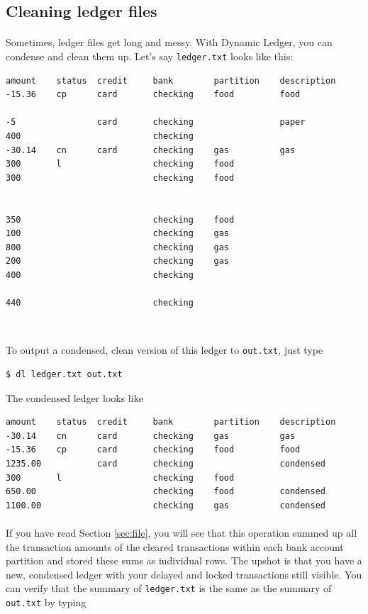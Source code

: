 \documentclass{article}
\providecommand{\q}{$\quad$ \newline}
\begin{document}
\begin{flushleft}
\clearpage

\subsection{Cleaning ledger files}

\paragraph{} Sometimes, ledger files get long and messy. With Dynamic Ledger, you can condense and clean them up. Let's say {\tt ledger.txt} looks like this: 

\begin{lstlisting}[title=ledger.txt]
amount    status  credit     bank        partition    description
-15.36    cp      card       checking    food         food

-5                card       checking                 paper
400                          checking
-30.14    cn      card       checking    gas          gas
300       l                  checking    food
300                          checking    food


350                          checking    food
100                          checking    gas
800                          checking    gas
200                          checking    gas
400                          checking

440                          checking
\end{lstlisting} \q

To output a condensed, clean version of this ledger to {\tt out.txt}, just type \q

\begin{lstlisting}
$ dl ledger.txt out.txt
\end{lstlisting} 

The condensed ledger looks like

\begin{lstlisting}[title=out.txt]
amount    status  credit     bank        partition    description
-30.14    cn      card       checking    gas          gas
-15.36    cp      card       checking    food         food
1235.00           card       checking                 condensed
300       l                  checking    food    
650.00                       checking    food         condensed
1100.00                      checking    gas          condensed
\end{lstlisting} 

\paragraph{} If you have read Section \ref{sec:file}, you will see that this operation summed up all the transaction amounts of the cleared transactions within each bank account partition and stored these sums as individual rows. The upshot is that you have a new, condensed ledger with your delayed and locked transactions still visible. You can verify that the summary of {\tt ledger.txt} is the same as the summary of {\tt out.txt} by typing \q


\end{flushleft}
\end{document}
